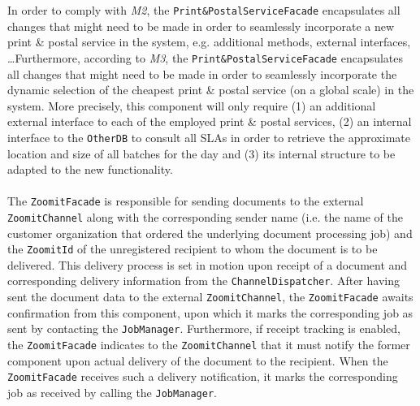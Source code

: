 \documentclass[a4paper,10pt]{article}
\begin{document}
In order to comply with \textit{M2}, the \texttt{Print\&PostalServiceFacade} encapsulates all changes that might need to be made in order to seamlessly incorporate a new print \& postal service in the system, e.g. additional methods, external interfaces, \dots Furthermore, according to \textit{M3}, the \texttt{Print\&PostalServiceFacade} encapsulates all changes that might need to be made in order to seamlessly incorporate the dynamic selection of the cheapest print \& postal service (on a global scale) in the system. More precisely, this component will only require (1) an additional external interface to each of the employed print \& postal services, (2) an internal interface to the \texttt{OtherDB} to consult all SLAs in order to retrieve the approximate location and size of all batches for the day and (3) its internal structure to be adapted to the new functionality.\\\\
The \texttt{ZoomitFacade} is responsible for sending documents to the external \texttt{ZoomitChannel} along with the corresponding sender name (i.e. the name of the customer organization that ordered the underlying document processing job) and the \texttt{ZoomitId} of the unregistered recipient to whom the document is to be delivered. This delivery process is set in motion upon receipt of a document and corresponding delivery information from the \texttt{ChannelDispatcher}. After having sent the document data to the external \texttt{ZoomitChannel}, the \texttt{ZoomitFacade} awaits confirmation from this component, upon which it marks the corresponding job as sent by contacting the \texttt{JobManager}. Furthermore, if receipt tracking is enabled, the \texttt{ZoomitFacade} indicates to the \texttt{ZoomitChannel} that it must notify the former component upon actual delivery of the document to the recipient. When the \texttt{ZoomitFacade} receives such a delivery notification, it marks the corresponding job as received by calling the \texttt{JobManager}.\\\\
\end{document}
